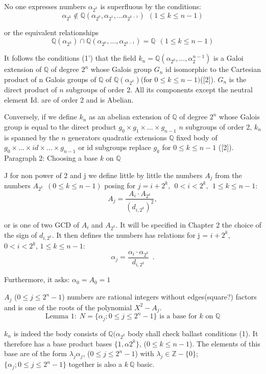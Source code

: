 \documentclass{article}
\begin{document}
\par No one expresses numbers $\alpha_{2^k}$ is superfluous by the conditions: 
$$ \alpha_{2^k} \not\in \mathbb{Q}(\alpha_{2^0}, \alpha_{2^1}, \ldots \alpha_{2^{k-1}})\ \ (1 \leq k \leq n-1)$$ 
\par or the equivalent relationships
$$ \mathbb{Q}(\alpha_{2^k}) \cap \mathbb{Q}(\alpha_{2^0}, \ldots, \alpha_{2^{k-1}}) = \mathbb{Q}\ \ (1\leq k \leq n-1)$$
\par It follows the conditions (1') that the field $k_n = \mathbb{Q}(\alpha_{2^0}, \ldots, \alpha_2^{n-1})$ is a Galoi extension of $\mathbb{Q}$ of degree $2^n$ whose Galois group $G_n$ id isomorphic to the Cartesian product of n Galois groups of $\mathbb{Q}$ of $\mathbb{Q}(\alpha_{2^k})$(for $ 0 \leq k \leq n-1)$([2]). $G_n$ is the direct product of $n$ subgroups of order 2. All its components except the neutral element Id. are of order 2 and is Abelian. 
\par Conversely, if we define $k_n$ as an abelian extension of $\mathbb{Q}$ of degree $2^n$ whose Galois group is equal to the direct product $g_0 \times g_1 \times \ldots \times g_{n-1}$ $n$ subgroups of order 2, $k_n$ is spanned by the $n$ generators quadratic extensions $\mathbb{Q}$ fixed body of $g_0 \times \ldots \times {id} \times \ldots \times g_{n-1}$ or {id} subgroups replace $g_k$ for $0 \leq k \leq n-1$ ([2]).\\ 
{\large Paragraph 2: Choosing a base $k$ on $\mathbb{Q}$}
\par J for non power of 2 and j we define little by little the numbers $A_j$ from the numbers $A_{2^k}\ \ (0\leq k \leq n-1)$ posing for $j = i +2^k, \ \ 0<i<2^k, \ \ 1\leq k \leq n-1$:
$$ A_j = \dfrac{A_i \cdot A_{2^k}}{(d_{i,2^k})^2}, $$
\par or is one of two GCD of $A_i$ and $A_{2^k}$. It will be specified in Chapter 2 the choice of the sign of $d_{i,2^k}$. It then defines the numbers has relations for j = $i + 2^k$, $0<i<2^k$, $1\leq k \leq n-1$:
$$ \alpha_j = \dfrac{\alpha_i \cdot \alpha_{2^k}}{d_{i,2^k}}\ \ .$$
\par Furthermore, it asks: $\alpha_0 = A_0 = 1$
\par $A_j$ ($0\leq j \leq 2^n-1$) numbers are rational integers without edges(square?) factors and is one of the roots of the polynomial $X^2 - A_j$. 
$$\text{Lemma 1:}\ \ N = \{\alpha_j ; 0\leq j \leq 2^n-1\} \text{ is a base for } k \text{ on } \mathbb{Q}$$
\par $k_n$ is indeed the body consists of $\mathbb{Q}(\alpha_{2^k}$ body shall check ballast conditions (1). It therefore has a base product bases $\{1,\alpha{2^k}\}$, ($0\leq k \leq n-1$). The elements of this base are of the form $\lambda_j \alpha_j$, ($0\leq j \leq 2^n-1$) with $\lambda_j \in \mathbb{Z}-\{0\}$; $\{\alpha_j ; 0 \leq j \leq 2^n-1 \}$ together is also a $k\ \mathbb{Q}$ basic. \\
\end{document}
